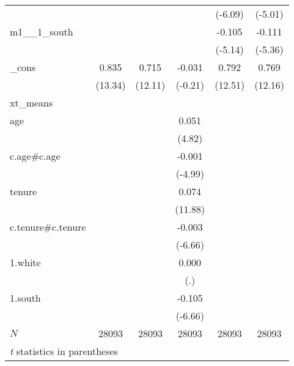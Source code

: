 \begin{tabular}{l*{5}{c}}
            &            &            &            &     (-6.09)&     (-5.01)\\
m1\_\_1\_south &            &            &            &      -0.105&      -0.111\\
            &            &            &            &     (-5.14)&     (-5.36)\\
\_cons      &       0.835&       0.715&      -0.031&       0.792&       0.769\\
            &     (13.34)&     (12.11)&     (-0.21)&     (12.51)&     (12.16)\\
\hline
xt\_means    &            &            &            &            &            \\
age         &            &            &       0.051&            &            \\
            &            &            &      (4.82)&            &            \\
c.age\#c.age &            &            &      -0.001&            &            \\
            &            &            &     (-4.99)&            &            \\
tenure      &            &            &       0.074&            &            \\
            &            &            &     (11.88)&            &            \\
c.tenure\#c.tenure&            &            &      -0.003&            &            \\
            &            &            &     (-6.66)&            &            \\
1.white     &            &            &       0.000&            &            \\
            &            &            &         (.)&            &            \\
1.south     &            &            &      -0.105&            &            \\
            &            &            &     (-6.66)&            &            \\
\hline
\(N\)       &       28093&       28093&       28093&       28093&       28093\\
\hline\hline
\multicolumn{6}{l}{\footnotesize \textit{t} statistics in parentheses}\\
\end{tabular}
